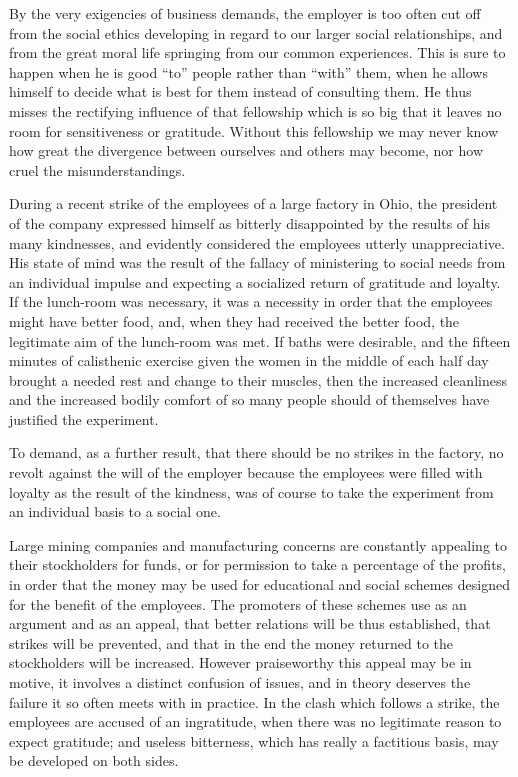 \documentclass[]{article}
\begin{document}
\begin{sectionbody}
\addamsparagraph By the very exigencies of business demands, the employer is too often
cut off from the social ethics developing in regard to our larger social
relationships, and from the great moral life springing from our common
experiences. This is sure to happen when he is good ``to'' people rather
than ``with'' them, when he allows himself to decide what is best for them
instead of consulting them. He thus misses the rectifying influence of
that fellowship which is so big that it leaves no room for
sensitiveness or gratitude. Without this fellowship we may never know
how great the divergence between ourselves and others may become, nor
how cruel the misunderstandings.

\addamsparagraph During a recent strike of the employees of a large factory in Ohio, the
president of the company expressed himself as bitterly disappointed by
the results of his many kindnesses, and evidently considered the
employees utterly unappreciative. His state of mind was the result of
the fallacy of ministering to social needs from an individual impulse
and expecting a socialized return of gratitude and loyalty. If the
lunch-room was necessary, it was a necessity in order that the employees
might have better food, and, when they had received the better food, the
legitimate aim of the lunch-room was met. If baths were desirable, and
the fifteen minutes of calisthenic exercise given the women in the
middle of each half day brought a needed rest and change to their
muscles, then the increased cleanliness and the increased bodily
comfort of so many people should of themselves have justified the
experiment.

\addamsparagraph To demand, as a further result, that there should be no strikes in the
factory, no revolt against the will of the employer because the
employees were filled with loyalty as the result of the kindness, was of
course to take the experiment from an individual basis to a social one.

\addamsparagraph Large mining companies and manufacturing concerns are constantly
appealing to their stockholders for funds, or for permission to take a
percentage of the profits, in order that the money may be used for
educational and social schemes designed for the benefit of the
employees. The promoters of these schemes use as an argument and as an
appeal, that better relations will be thus established, that strikes
will be prevented, and that in the end the money returned to the
stockholders will be increased. However praiseworthy this appeal may be
in motive, it involves a distinct confusion of issues, and in theory
deserves the failure it so often meets with in practice. In the clash
which follows a strike, the employees are accused of an ingratitude,
when there was no legitimate reason to expect gratitude; and useless
bitterness, which has really a factitious basis, may be developed on
both sides.


\end{sectionbody}
\end{document}
